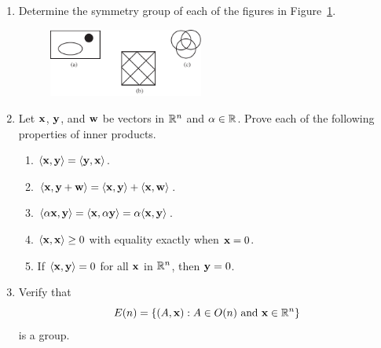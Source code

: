 {\begin{enumerate}
\begin{minipage}[t]{4.6in}
\begin{minipage}[t]{2.25in}
\begin{itemize}
 
\end{itemize}
\end{minipage}
\end{minipage}
 
\vspace{2pt}        %
 
 
 
\bf\item\rm %
Determine the symmetry group of each of the figures in
Figure~\ref{Determine}. 
\begin{figure}[htb]
\begin{center}
\centerline {
\includegraphics[width=2in]{SymmetryGrp}
}
\end{center}
\caption{}
\label{Determine}
\end{figure}
 
 
\bf\item\rm
Let ${\bold x}$, ${\bold y}$, and ${\bold w}$ be vectors in ${\Bbb
R}^n$ and $\alpha \in {\Bbb R}$.  Prove each of the following
properties of inner products.
\begin{enumerate}
 
 \bf\item\rm
$\langle {\bold x}, {\bold y} \rangle = \langle {\bold y}, {\bold x}
\rangle$. 
 
 \bf\item\rm
$\langle {\bold x}, {\bold y} + {\bold w} \rangle = \langle
{\bold x}, {\bold y} \rangle + \langle {\bold x}, {\bold w}
\rangle$.
 
 \bf\item\rm
$\langle \alpha {\bold x}, {\bold y} \rangle = \langle
{\bold x}, \alpha {\bold y} \rangle = \alpha \langle  {\bold
x}, {\bold y} \rangle$.
 
 \bf\item\rm
$\langle {\bold x}, {\bold x} \rangle \geq 0$ with equality exactly
when ${\bold x} = 0$. 
 
 \bf\item\rm
If $\langle {\bold x}, {\bold y} \rangle = 0$  for all ${\bold x}$ in
${\Bbb R}^n$, then ${\bold y} = 0$. 
 
\end{enumerate}
 
 
\bf\item\rm
Verify that
\[
E(n)
=
\{(A, {\bold x}) : A \in O(n) \mbox{ and } {\bold x} \in
{\Bbb R}^n \}
\]
is a group.
 

\end{enumerate}}

